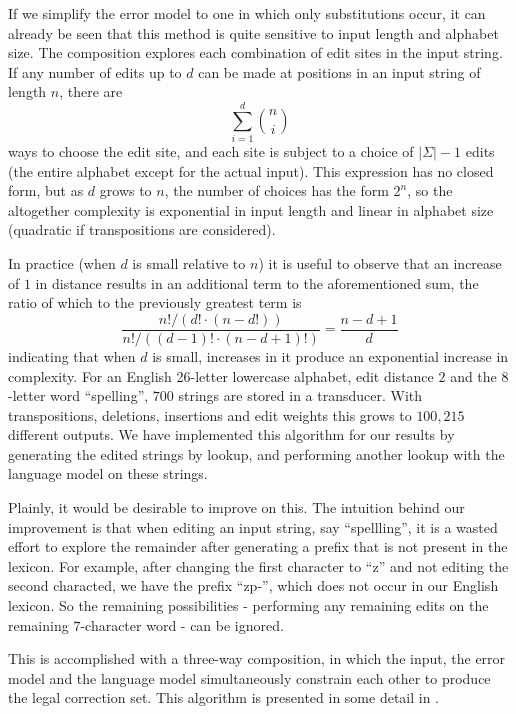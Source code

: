 \documentclass[11pt]{article}
\begin{document}
If we simplify the error model to one in which only substitutions occur, it can
already be seen that this method is quite sensitive to input length and
alphabet size. The composition explores each combination of edit sites in the
input string. If any number of edits up to $d$ can be made at positions in an
input string of length $n$, there are
\begin{displaymath}
\sum_{i=1}^{d} {n \choose i}
\end{displaymath}
ways to choose the edit site, and each site is subject to a choice of
$|\Sigma| - 1$ edits (the
entire alphabet except for the actual input). This expression has no closed
form, but as $d$ grows to $n$, the number of choices has the form $2^n$,
so the altogether complexity is exponential in input length and linear
in alphabet size (quadratic if transpositions are considered).

In practice
(when $d$ is small relative to $n$) it is useful to observe that an
increase of $1$ in distance results
in an additional term to the aforementioned sum,
the ratio of which to the previously greatest term is
\begin{displaymath}
\frac{n!/(d!\cdot(n-d!))}{n!/((d-1)!\cdot(n-d+1)!)} = \frac{n-d+1}{d}
\end{displaymath}
indicating that when $d$ is small, increases in it produce an
exponential increase in complexity.
For an English 26-letter lowercase alphabet, edit
distance $2$ and the $8$-letter word ``spelling'', $700$ strings are
stored in a transducer. With transpositions, deletions, insertions and edit
weights this grows to $100,215$ different outputs. We
have implemented this algorithm for our results by generating the edited
strings by lookup, and performing another lookup with the language model on
these strings.

Plainly, it would be desirable to improve on this. The intuition behind our
improvement is that when editing an input string, say ``spellling'', it is a
wasted effort to explore the remainder after generating a prefix that is not
present in the lexicon. For example, after changing the first character to ``z''
and not editing the second characted, we have the prefix \mbox{``zp-''}, which does
not occur in our English lexicon. So the remaining possibilities - performing
any remaining edits on the remaining $7$-character word - can be ignored.

This is accomplished with a three-way composition, in which the input, the
error model and the language model simultaneously constrain each other to
produce the legal correction set. This algorithm is presented in some detail
in .
\end{document}
